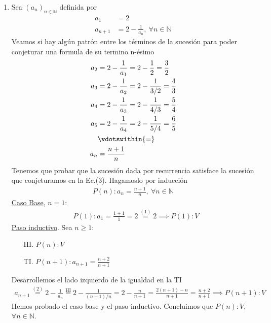 \begin{enumerate}[label=\roman*)]
    \item Sea $(a_n)_{n \in \mathbb{N}}$ definida por
    \setcounter{equation}{0}
    \begin{align}
        a_1 &= 2 \\
        a_{n+1} &= 2 - \frac{1}{a_n},\ \forall n \in \mathbb{N}
    \end{align}
    Veamos si hay algún patrón entre los términos de la sucesión para poder conjeturar una formula de su termino 
    n-ésimo
    \begin{align}
        a_2 &= 2 - \frac{1}{a_1} = 2 - \frac{1}{2} = \frac{3}{2} \nonumber \\
        a_3 &= 2 - \frac{1}{a_2} = 2 - \frac{1}{3/2} = \frac{4}{3} \nonumber \\
        a_4 &= 2 - \frac{1}{a_3} = 2 - \frac{1}{4/3} = \frac{5}{4} \nonumber  \\
        a_5 &= 2 - \frac{1}{a_4} = 2 - \frac{1}{5/4} = \frac{6}{5} \nonumber \\
        &\vdotswithin{=} \nonumber \\
        a_n &= \frac{n+1}{n}
    \end{align}
    Tenemos que probar que la sucesión dada por recurrencia satisface la sucesión que conjeturamos en la Ec.(3). 
    Hagamoslo por inducción
    \begin{align*}
        P(n): a_n = \frac{n+1}{n},\ \forall n \in \mathbb{N}
    \end{align*}
    \underline{Caso Base}, $n = 1$:
	    \begin{align*}
		    &P(1): a_1 = \frac{1+1}{1} = 2 \overset{(1)}{=} 2 \implies P(1):V
	    \end{align*}
	\underline{Paso inductivo}. Sea $n \geq 1$:
	\begin{enumerate}
        \item[HI.] $P(n): V$
        \item[TI.] $P(n+1): a_{n+1} = \displaystyle \frac{n+2}{n+1}$
    \end{enumerate}
 	Desarrollemos el lado izquierdo de la igualdad en la TI
    \begin{align*}
  	    a_{n+1} \overset{(2)}{=} 2 - \frac{1}{a_n} \overset{\text{HI}}{=} 2 - \frac{1}{(n+1)/n} = 2 - \frac{n}{n+1} =
        \frac{2(n+1) - n}{n+1} = \frac{n+2}{n+1} 
        \implies P(n+1):V
    \end{align*}
    Hemos probado el caso base y el paso inductivo. Concluimos que $P(n):V,$ $\forall n \in \mathbb{N}$.
\end{enumerate}
